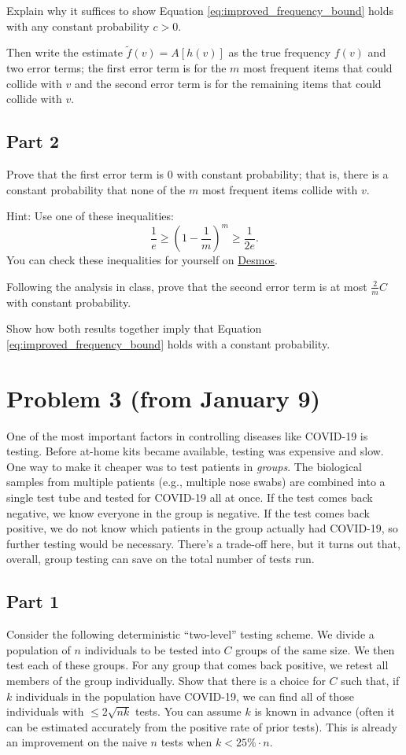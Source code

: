 \documentclass{article}
\begin{document}
Explain why it suffices to show Equation \ref{eq:improved_frequency_bound} holds with any constant probability $c > 0$.

Then write the estimate $\tilde{f}(v) = A[h(v)]$ as the true frequency $f(v)$ and two error terms; the first error term is for the $m$ most frequent items that could collide with $v$ and the second error term is for the remaining items that could collide with $v$.

\subsection*{Part 2}
Prove that the first error term is 0 with constant probability; that is, there is a constant probability that none of the $m$ most frequent items collide with $v$.

Hint: Use one of these inequalities: $$\frac1{e} \geq \left(1-\frac1{m}\right)^m \geq \frac{1}{2e}.$$ You can check these inequalities for yourself on \href{https://www.desmos.com/calculator/bok5upfowo}{Desmos}.

Following the analysis in class, prove that the second error term is at most $\frac{2}{m}C$ with constant probability.

Show how both results together imply that Equation \ref{eq:improved_frequency_bound} holds with a constant probability.

%

\section*{Problem 3 (from January 9)}

One of the most important factors in controlling diseases like COVID-19 is testing. Before at-home kits became available, testing was expensive and slow. One way to make it cheaper was to test patients in \emph{groups}. The biological samples from multiple patients (e.g., multiple nose swabs) are combined into a single test tube and tested for COVID-19 all at once. If the test comes back negative, we know everyone in the group is negative. If the test comes back positive, we do not know which patients in the group actually had COVID-19, so further testing would be necessary. There's a trade-off here, but it turns out that, overall, group testing can save on the total number of tests run. 

\subsection*{Part 1}
Consider the following deterministic ``two-level'' testing scheme. We divide a population of $n$ individuals to be tested into $C$ groups of the same size. We then test each of these groups. For any group that comes back positive, we retest all members of the group individually. Show that there is a choice for $C$ such that, if $k$ individuals in the population have COVID-19, we can find all of those individuals with $\leq 2\sqrt{nk}$ tests. You can assume $k$ is known in advance (often it can be estimated accurately from the positive rate of prior tests). This is already an improvement on the naive $n$ tests when $k < 25\% \cdot n$.
	
\end{document}
